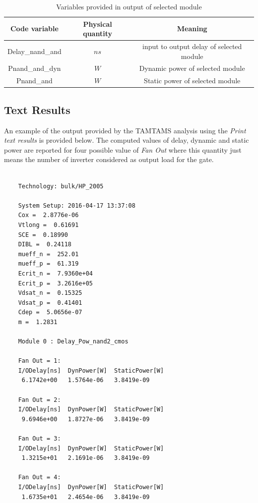 \documentclass[12pt,  english, makeidx, a4paper, titlepage, oneside]{article}
\begin{document}
\begin{table}[htbp]
	\begin{center}
		\begin{tabular}{|c|c|c|}
			\hline
			Code variable & Physical quantity & Meaning\\
			\hline
			Delay\_nand\_and & $ns$ & input to output delay of selected module\\
			\hline
			Pnand\_and\_dyn & $W$ & Dynamic power of selected module\\
			\hline
			Pnand\_and  & $W$ & Static power of selected module\\
			\hline
		\end{tabular}
	\end{center}
	\caption{Variables provided in output of selected module}
	\label{tab:output_var}
\end{table}
\newpage
\subsection{Text Results}
An example of the output provided by the TAMTAMS analysis using the \textit{Print text results} is provided below.
The computed values of delay, dynamic and static power are reported for four possible value of \textit{Fan Out} where this quantity just means the number of inverter considered as output load for the gate.
\footnotesize
\begin{verbatim}

    Technology: bulk/HP_2005 

    System Setup: 2016-04-17 13:37:08 
    Cox =  2.8776e-06
    Vtlong =  0.61691
    SCE =  0.18990
    DIBL =  0.24118
    mueff_n =  252.01
    mueff_p =  61.319
    Ecrit_n =  7.9360e+04
    Ecrit_p =  3.2616e+05
    Vdsat_n =  0.15325
    Vdsat_p =  0.41401
    Cdep =  5.0656e-07
    m =  1.2831

    Module 0 : Delay_Pow_nand2_cmos 

    Fan Out = 1:
    I/ODelay[ns]  DynPower[W]  StaticPower[W]
     6.1742e+00   1.5764e-06   3.8419e-09

    Fan Out = 2:
    I/ODelay[ns]  DynPower[W]  StaticPower[W]
     9.6946e+00   1.8727e-06   3.8419e-09

    Fan Out = 3:
    I/ODelay[ns]  DynPower[W]  StaticPower[W]
     1.3215e+01   2.1691e-06   3.8419e-09

    Fan Out = 4:
    I/ODelay[ns]  DynPower[W]  StaticPower[W]
     1.6735e+01   2.4654e-06   3.8419e-09
\end{verbatim}
\normalsize
\end{document}

